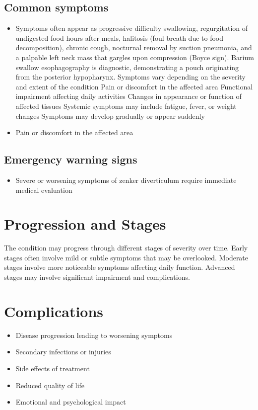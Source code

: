 \subsection{Common symptoms}
\begin{itemize}[noitemsep]
  \item Symptoms often appear as progressive difficulty swallowing, regurgitation of undigested food hours after meals, halitosis (foul breath due to food decomposition), chronic cough, nocturnal removal by suction pneumonia, and a palpable left neck mass that gargles upon compression (Boyce sign). Barium swallow esophagography is diagnostic, demonstrating a pouch originating from the posterior hypopharynx. Symptoms vary depending on the severity and extent of the condition Pain or discomfort in the affected area Functional impairment affecting daily activities Changes in appearance or function of affected tissues Systemic symptoms may include fatigue, fever, or weight changes Symptoms may develop gradually or appear suddenly
  \item Pain or discomfort in the affected area
  \end{itemize}

\subsection{Emergency warning signs}
\begin{itemize}[noitemsep]
  \item Severe or worsening symptoms of zenker diverticulum require immediate medical evaluation
\end{itemize}
\section{Progression and Stages}
The condition may progress through different stages of severity over time. Early stages often involve mild or subtle symptoms that may be overlooked. Moderate stages involve more noticeable symptoms affecting daily function. Advanced stages may involve significant impairment and complications.
\section{Complications}
\begin{itemize}[noitemsep]
  \item Disease progression leading to worsening symptoms
  \item Secondary infections or injuries
  \item Side effects of treatment
  \item Reduced quality of life
  \item Emotional and psychological impact
\end{itemize}

